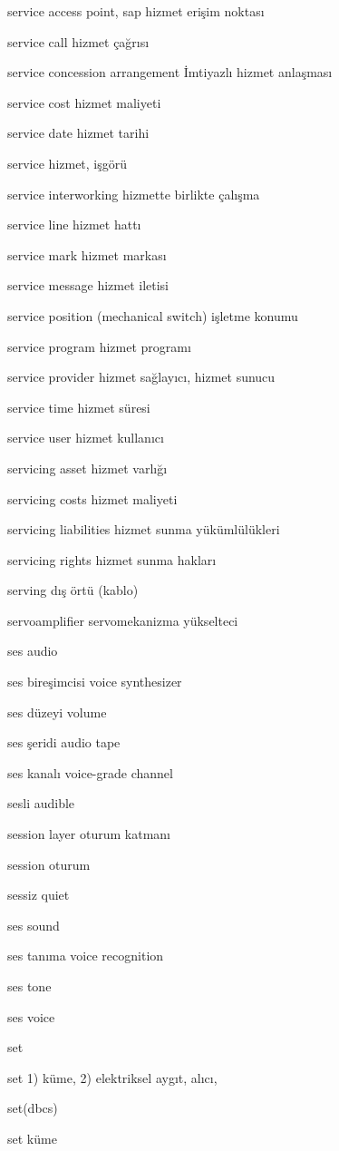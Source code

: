 \documentclass[12pt,fleqn]{article}\usepackage{../../common}
\begin{document}
service access point, sap hizmet erişim noktası

service call hizmet çağrısı

service concession arrangement İmtiyazlı hizmet anlaşması

service cost hizmet maliyeti

service date hizmet tarihi

service hizmet, işgörü

service interworking hizmette birlikte çalışma

service line hizmet hattı

service mark hizmet markası

service message hizmet iletisi

service position (mechanical switch) işletme konumu

service program hizmet programı

service provider hizmet sağlayıcı, hizmet sunucu

service time hizmet süresi

service user hizmet kullanıcı

servicing asset hizmet varlığı

servicing costs hizmet maliyeti

servicing liabilities hizmet sunma yükümlülükleri

servicing rights hizmet sunma hakları

serving dış örtü (kablo)

servoamplifier servomekanizma yükselteci

ses audio

ses bireşimcisi voice synthesizer

ses düzeyi volume

ses şeridi audio tape

ses kanalı voice-grade channel

sesli audible

session layer oturum katmanı

session oturum

sessiz quiet

ses sound

ses tanıma voice recognition

ses tone

ses voice

set

set 1) küme, 2) elektriksel aygıt, alıcı,

set(dbcs)

set küme
\end{document}
